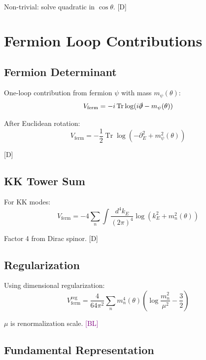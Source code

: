 \documentclass[11pt,a4paper]{article}
\newcommand{\tagD}{\textcolor{blue!70!black}{[D]}}
\newcommand{\tagBL}{\textcolor{purple}{[BL]}}
\DeclareMathOperator{\Tr}{Tr}
\begin{document}
Non-trivial: solve quadratic in $\cos\theta$. \tagD

\section{Fermion Loop Contributions}

\subsection{Fermion Determinant}

One-loop contribution from fermion $\psi$ with mass $m_\psi(\theta)$:
\begin{equation}
\label{eq:ferm-det}
V_{\text{ferm}} = -i\Tr\log(i\slashed{\partial} - m_\psi(\theta))
\end{equation}

After Euclidean rotation:
\begin{equation}
\label{eq:ferm-det-E}
V_{\text{ferm}} = -\frac{1}{2}\Tr\log(-\partial_E^2 + m_\psi^2(\theta))
\end{equation}

\tagD

\subsection{KK Tower Sum}

For KK modes:
\begin{equation}
\label{eq:ferm-kk-sum}
V_{\text{ferm}} = -4 \sum_n \int \frac{d^4k_E}{(2\pi)^4} \log(k_E^2 + m_n^2(\theta))
\end{equation}

Factor 4 from Dirac spinor. \tagD

\subsection{Regularization}

Using dimensional regularization:
\begin{equation}
\label{eq:ferm-reg}
V_{\text{ferm}}^{\text{reg}} = \frac{4}{64\pi^2} \sum_n m_n^4(\theta) \left(\log\frac{m_n^2}{\mu^2} - \frac{3}{2}\right)
\end{equation}

$\mu$ is renormalization scale. \tagBL

\subsection{Fundamental Representation}
\end{document}
